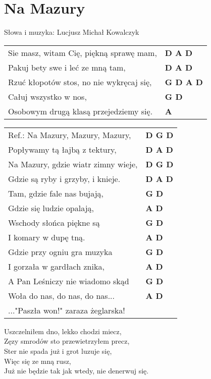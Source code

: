 \section{Na Mazury}

Słowa i muzyka: Lucjusz Michał Kowalczyk\\

\vspace{2em}
\begin{tabular}{@{}p{9cm}@{}l@{}}
Sie masz, witam Cię, piękną sprawę mam, & \bfseries  D A D \\
Pakuj bety swe i leć ze mną tam, & \bfseries  D A D \\
Rzuć kłopotów stos, no nie wykręcaj się, & \bfseries  G D A D \\
Całuj wszystko w nos, & \bfseries  G D \\
Osobowym drugą klasą przejedziemy się. & \bfseries  A \\
\end{tabular}

\vspace{1em}
\begin{tabular}{@{}p{9cm}@{}l@{}}
Ref.: Na Mazury, Mazury, Mazury, & \bfseries  D G D \\
Popływamy tą łajbą z tektury, & \bfseries  D A D \\
Na Mazury, gdzie wiatr zimny wieje, & \bfseries  D G D \\
Gdzie są ryby i grzyby, i knieje. & \bfseries  D A D \\
Tam, gdzie fale nas bujają,  & \bfseries G D \\
Gdzie się ludzie opalają,  & \bfseries A D \\
Wschody słońca piękne są  & \bfseries G D \\
I komary w dupę tną.  & \bfseries A D \\
Gdzie przy ogniu gra muzyka  & \bfseries G D \\
I gorzała w gardłach znika, & \bfseries A D \\
A Pan Leśniczy nie wiadomo skąd & \bfseries G D \\
Woła do nas, do nas, do nas... & \bfseries A D \\
..."Paszła won!"  zaraza żeglarska!  & \bfseries
\end{tabular}

\vspace{1em}

Uszczelniłem dno, lekko chodzi miecz, \\
Zęzy smrodów sto przewietrzyłem precz, \\
Ster nie spada już i grot luzuje się, \\
Więc się ze mną rusz, \\
Już nie będzie tak jak wtedy, nie denerwuj się. \\
\newpage

